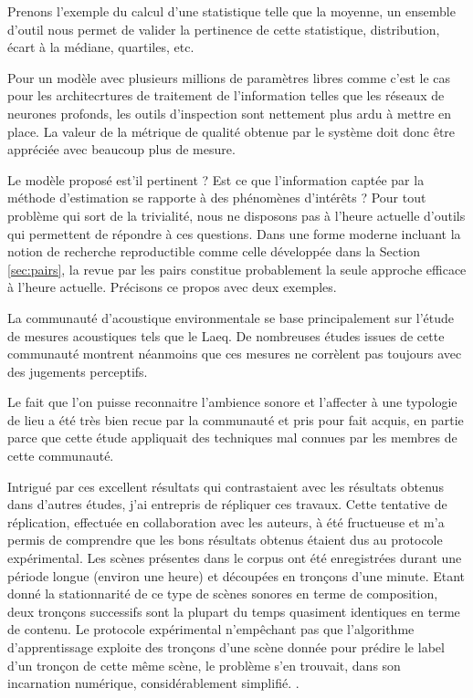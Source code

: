 Prenons l'exemple du calcul d'une statistique telle que la moyenne, un ensemble d'outil nous permet de valider la pertinence de cette statistique, distribution, écart à la médiane, quartiles, etc.

Pour un modèle avec plusieurs millions de paramètres libres comme c'est le cas pour les architecrtures de traitement de l'information telles que les réseaux de neurones profonds, les outils d'inspection sont nettement plus ardu à mettre en place. La valeur de la métrique de qualité obtenue par le système doit donc être appréciée avec beaucoup plus de mesure.

Le modèle proposé est'il pertinent ? Est ce que l'information captée par la méthode d'estimation se rapporte à des phénomènes d'intérêts ? Pour tout problème qui sort de la trivialité, nous ne disposons pas à l'heure actuelle d'outils qui permettent de répondre à ces questions. Dans une forme moderne incluant la notion de recherche reproductible comme celle développée dans la Section \ref{sec:pairs}, la revue par les pairs constitue probablement la seule approche efficace à l'heure actuelle. Précisons ce propos avec deux exemples.

La communauté d'acoustique environmentale se base principalement sur l'étude de mesures acoustiques tels que le Laeq. De nombreuses études issues de cette communauté montrent néanmoins que ces mesures ne corrèlent pas toujours avec des jugements perceptifs.

Le fait que l'on puisse reconnaitre l'ambience sonore et l'affecter à une typologie de lieu a été très bien recue par la communauté et pris pour fait acquis, en partie parce que cette étude appliquait des techniques mal connues par les membres de cette communauté.

Intrigué par ces excellent résultats qui contrastaient avec les résultats obtenus dans d'autres études, j'ai entrepris de répliquer ces travaux. Cette tentative de réplication, effectuée en collaboration avec les auteurs, à été fructueuse et m'a permis de comprendre que les bons résultats obtenus étaient dus au protocole expérimental\cite{lagrange2015}. Les scènes présentes dans le corpus ont été enregistrées durant une période longue (environ une heure) et découpées en tronçons d'une minute. Etant donné la stationnarité de ce type de scènes sonores en terme de composition, deux tronçons successifs sont la plupart du temps quasiment identiques en terme de contenu. Le protocole expérimental n'empêchant pas que l'algorithme d'apprentissage exploite des tronçons d'une scène donnée pour prédire le label d'un tronçon de cette même scène, le problème s'en trouvait, dans son incarnation numérique, considérablement simplifié. .


